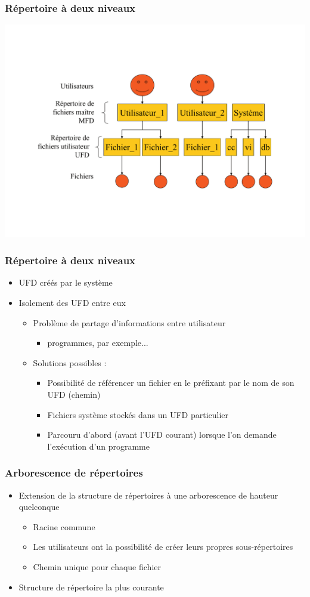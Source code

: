 \begin{frame}
\frametitle{Répertoire à deux niveaux}
\includegraphics[width=.9\textwidth]{../illustration/repertoire_2niveaux.pdf}
\end{frame}

\begin{frame}
\frametitle{Répertoire à deux niveaux}
\begin{itemize}
\item UFD créés par le système
\item Isolement des UFD entre eux
\begin{itemize}
\item Problème de partage d'informations entre utilisateur
\begin{itemize}
  \item programmes, par exemple...
\end{itemize}
\item Solutions possibles :
\begin{itemize}
\item Possibilité de référencer un fichier en le préfixant par le nom de son UFD (chemin)
\item Fichiers système stockés dans un UFD particulier
\item Parcouru d'abord (avant l'UFD courant) lorsque l'on demande l'exécution d'un programme
\end{itemize}
\end{itemize}
\end{itemize}
\end{frame}

\begin{frame}
\frametitle{Arborescence de répertoires}
\begin{itemize}
\item Extension de la structure de répertoires à une arborescence de hauteur quelconque
\begin{itemize}
\item Racine commune
\item Les utilisateurs ont la possibilité de créer leurs propres sous-répertoires
\item Chemin unique pour chaque fichier
\end{itemize}
\item Structure de répertoire la plus courante
\end{itemize}
\end{frame}

